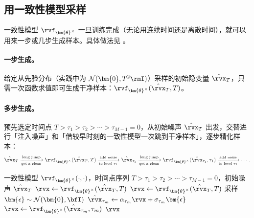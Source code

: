 \subsection{用一致性模型采样}\label{subsec:cm-sampling}
一致性模型 $\rvf_{\bm{\theta}^\times}$ 一旦训练完成（无论用连续时间还是离散时间），就可以用来一步或几步生成样本。具体做法见 。

\paragraph{一步生成。}给定从先验分布（实践中为 $\mathcal{N}(\bm{0}, T^2\rmI)$）采样的初始隐变量 $\hat{\rvx}_T$，只需一次函数求值即可生成干净样本：$\rvf_{\bm{\theta}^\times}(\hat{\rvx}_T, T)$。

\paragraph{多步生成。}预先选定时间点
$T>\tau_1 > \tau_2 > \cdots > \tau_{M-1}=0$，从初始噪声 $\hat\rvx_T$ 出发，交替进行「注入噪声」和「借较早时刻的一致性模型一次跳到干净样本」，逐步精化样本：
\begin{align*}
    \hat\rvx_T \xrightarrow[\text{get a clean}]{\text{long jump}} \rvf_{\bm{\theta}^\times}(\hat\rvx_T, T)
    \xrightarrow[\text{to level $\tau_1$}]{\text{add noise}} \hat\rvx_{\tau_1}
    \xrightarrow[\text{get a clean}]{\text{long jump}} \rvf_{\bm{\theta}^\times}(\hat\rvx_{\tau_1}, \tau_1)
    \xrightarrow[\text{to level $\tau_2$}]{\text{add noise}} \cdots.
\end{align*}

\begin{algorithm}[thb!]
    {\small
        \caption{一致性模型的一步或多步采样 \label{alg:cm_sampling}}
    \begin{algorithmic}[1]
        \Require 一致性模型 $\rvf_{\bm{\theta}^\times}(\cdot, \cdot)$，时间点序列 $T>\tau_1 > \tau_2 > \cdots > \tau_{M-1}=0$，初始噪声 $\hat{\rvx}_T$
            \State $\rvx \leftarrow \rvf_{\bm{\theta}^\times}(\hat{\rvx}_T, T)$
        \Else
            \State $\rvx \leftarrow \rvf_{\bm{\theta}^\times}(\hat{\rvx}_T, T)$
                \State 采样 $\bm{\epsilon} \sim \mathcal{N}(\bm{0}, \bfI)$
                \State $\hat{\rvx}_{\tau_m} \leftarrow \alpha_{\tau_m}\rvx + \sigma_{\tau_m} \bm{\epsilon}$
                \State $\rvx \leftarrow \rvf_{\bm{\theta}^\times}(\hat{\rvx}_{\tau_m}, \tau_m)$
            \EndFor
        \EndIf
        \Ensure $\rvx$
    \end{algorithmic}
    }
\end{algorithm}


